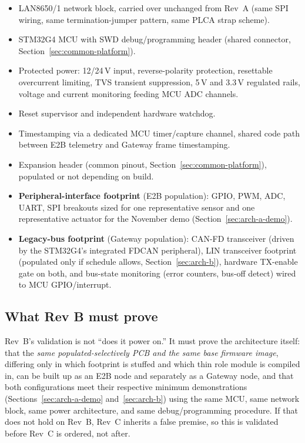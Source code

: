 \begin{itemize}[itemsep=0.1em]
\item LAN8650/1 network block, carried over unchanged from Rev~A (same SPI wiring, same termination-jumper pattern, same PLCA strap scheme).
\item STM32G4 MCU with SWD debug/programming header (shared connector, Section~\ref{sec:common-platform}).
\item Protected power: 12/24\,V input, reverse-polarity protection, resettable overcurrent limiting, TVS transient suppression, 5\,V and 3.3\,V regulated rails, voltage and current monitoring feeding MCU ADC channels.
\item Reset supervisor and independent hardware watchdog.
\item Timestamping via a dedicated MCU timer/capture channel, shared code path between E2B telemetry and Gateway frame timestamping.
\item Expansion header (common pinout, Section~\ref{sec:common-platform}), populated or not depending on build.
\item \textbf{Peripheral-interface footprint} (E2B population): GPIO, PWM, ADC, UART, SPI breakouts sized for one representative sensor and one representative actuator for the November demo (Section~\ref{sec:arch-a-demo}).
\item \textbf{Legacy-bus footprint} (Gateway population): CAN-FD transceiver (driven by the STM32G4's integrated FDCAN peripheral), LIN transceiver footprint (populated only if schedule allows, Section~\ref{sec:arch-b}), hardware TX-enable gate on both, and bus-state monitoring (error counters, bus-off detect) wired to MCU GPIO/interrupt.
\end{itemize}

\subsection{What Rev B must prove}

Rev~B's validation is not ``does it power on.'' It must prove the architecture itself: that the \emph{same populated-selectively PCB and the same base firmware image}, differing only in which footprint is stuffed and which thin role module is compiled in, can be built up as an E2B node and separately as a Gateway node, and that both configurations meet their respective minimum demonstrations (Sections~\ref{sec:arch-a-demo} and~\ref{sec:arch-b}) using the same MCU, same network block, same power architecture, and same debug/programming procedure. If that does not hold on Rev~B, Rev~C inherits a false premise, so this is validated before Rev~C is ordered, not after.

